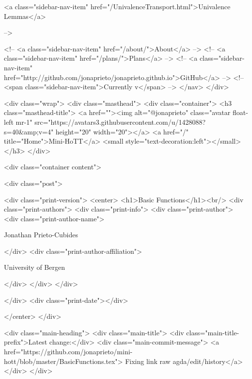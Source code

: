       
    
      
        
          <a class="sidebar-nav-item" href="/UnivalenceTransport.html">Univalence Lemmas</a>
        
      
     -->

    <!-- <a class="sidebar-nav-item" href="/about/">About</a> -->
    <!-- <a class="sidebar-nav-item" href="/plans/">Plans</a> -->
    <!-- <a class="sidebar-nav-item" href="http://github.com/jonaprieto/jonaprieto.github.io">GitHub</a> -->
    <!-- <span class="sidebar-nav-item">Currently v</span> -->
  </nav>
</div>

    <div class="wrap">
      <div class="masthead">
        <div class="container">
          <h3 class="masthead-title">
            <a href=""><img alt="@jonaprieto" class="avatar float-left mr-1" src="https://avatars3.githubusercontent.com/u/1428088?s=40&amp;v=4" height="20" width="20"></a>
            <a href="/" title="Home">Mini-HoTT</a>
            <small style="text-decoration:left"></small>
          </h3>
        </div>
      
      <div class="container content">
        







<div class="post">

  <div class="print-version">
    <center>
      <h1>Basic Functions</h1><br/>
        <div class="print-authors">
          <div class="print-info">
            <div class="print-author">
              <div class="print-author-name">
                
                  Jonathan Prieto-Cubides
                
              </div>
              <div class="print-author-affiliation">
                
                  University of Bergen
                
                </div>
            </div>
          </div>
          
          
        </div>
        <div class="print-date"></div>
        
        
    </center>
  </div>

  
  <div class="main-heading">
    <div class="main-title">
      <div class="main-title-prefix">Latest change:</div>
      <div class="main-commit-message">
            <a href="https://github.com/jonaprieto/mini-hott/blob/master/BasicFunctions.tex">
              Fixing link raw agda/edit/history</a>
      </div>
    </div>

